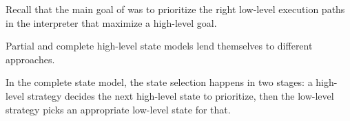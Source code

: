 


Recall that the main goal of \chef was to prioritize the right low-level execution paths in the interpreter that maximize a high-level goal.

Partial and complete high-level state models lend themselves to different approaches.

In the complete state model, the state selection happens in two stages: a high-level strategy decides the next high-level state to prioritize, then the low-level strategy picks an appropriate low-level state for that.


